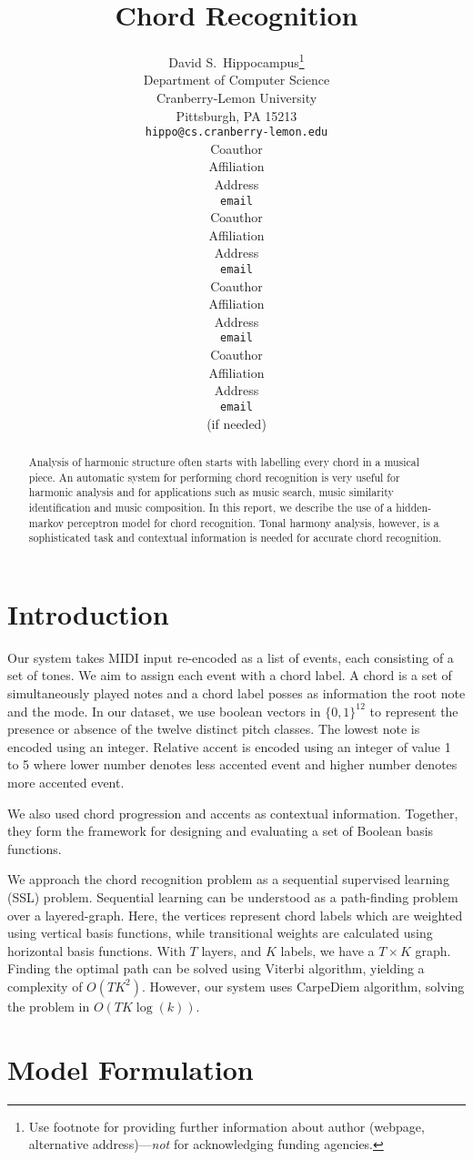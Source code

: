 \documentclass{article} %
\title{Chord Recognition}
\author{
David S.~Hippocampus\thanks{ Use footnote for providing further information
about author (webpage, alternative address)---\emph{not} for acknowledging
funding agencies.} \\
Department of Computer Science\\
Cranberry-Lemon University\\
Pittsburgh, PA 15213 \\
\texttt{hippo@cs.cranberry-lemon.edu} \\
\And
Coauthor \\
Affiliation \\
Address \\
\texttt{email} \\
\AND
Coauthor \\
Affiliation \\
Address \\
\texttt{email} \\
\And
Coauthor \\
Affiliation \\
Address \\
\texttt{email} \\
\And
Coauthor \\
Affiliation \\
Address \\
\texttt{email} \\
(if needed)\\
}
\begin{document}
\maketitle

\begin{abstract}
Analysis of harmonic structure often starts with labelling every chord in a musical piece. An automatic system for performing chord recognition is very useful for harmonic analysis and for applications such as music search, music similarity identification and music composition. In this report, we describe the use of a hidden-markov perceptron model for chord recognition. Tonal harmony analysis, however, is a sophisticated task and contextual information is needed for accurate chord recognition.
\end{abstract}

\section{Introduction}

Our system takes MIDI input re-encoded as a list of events, each consisting of a set of tones. We aim to assign each event with a chord label. A chord is a set of simultaneously played notes and a chord label posses as information the root note and the mode. In our dataset, we use boolean vectors in $\{0,1\}^{12}$ to represent the presence or absence of the twelve distinct pitch classes. The lowest note is encoded using an integer. Relative accent is encoded using an integer of value 1 to 5 where lower number denotes less accented event and higher number denotes more accented event.

We also used chord progression and accents as contextual information. Together, they form the framework for designing and evaluating a set of Boolean basis functions.

We approach the chord recognition problem as a sequential supervised learning (SSL) problem. Sequential learning can be understood as a path-finding problem over a layered-graph. Here, the vertices represent chord labels which are weighted using vertical basis functions, while transitional weights are calculated using horizontal basis functions. With $T$ layers, and $K$ labels, we have a $T \times K$ graph. Finding the optimal path can be solved using Viterbi algorithm, yielding a complexity of $O(TK^2)$. However, our system uses CarpeDiem algorithm, solving the problem in $O(TK\log(k))$.

\section{Model Formulation}
\end{document}
